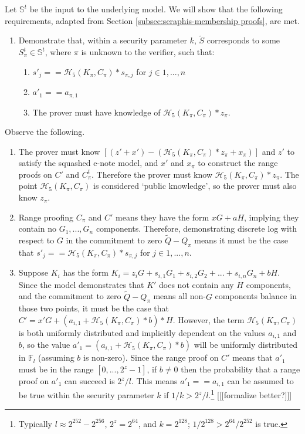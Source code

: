 \begin{appendices}
Let $\mathbb{S}^t$ be the input to the underlying model. We will show that the following requirements, adapted from Section \ref{subsec:seraphis-membership proofs}, are met.

\begin{enumerate}
    \item Demonstrate that, within a security parameter $k$, $\tilde{S}$ corresponds to some $S^t_{\pi} \in \mathbb{S}^t$, where $\pi$ is unknown to the verifier, such that:
    \begin{enumerate}
        \item $s'_j == \mathcal{H}_5(K_{\pi}, C_{\pi})*s_{\pi,j}$ for $j \in 1,...,n$
        \item $a'_1 == a_{\pi,1}$
        \item The prover must have knowledge of $\mathcal{H}_5(K_{\pi}, C_{\pi})*z_{\pi}$.
    \end{enumerate}
\end{enumerate}

Observe the following.

\begin{enumerate}
    \item The prover must know $[(z' + x') - (\mathcal{H}_5(K_{\pi}, C_{\pi})*z_{\pi} + x_{\pi})]$ and $z'$ to satisfy the squashed e-note model, and $x'$ and $x_{\pi}$ to construct the range proofs on $C'$ and $C^t_{\pi}$. Therefore the prover must know $\mathcal{H}_5(K_{\pi}, C_{\pi})*z_{\pi}$. The point $\mathcal{H}_5(K_{\pi}, C_{\pi})$ is considered `public knowledge', so the prover must also know $z_{\pi}$.

    \item Range proofing $C_{\pi}$ and $C'$ means they have the form $x G + a H$, implying they contain no $G_1,...,G_n$ components. Therefore, demonstrating discrete log with respect to $G$ in the commitment to zero $\tilde{Q} - Q_{\pi}$ means it must be the case that $s'_j == \mathcal{H}_5(K_{\pi}, C_{\pi})*s_{\pi,j}$ for $j \in 1,...,n$.

    \item Suppose $K_i$ has the form $K_i = z_i G + s_{i,1} G_1 + s_{i,2} G_2 + ... + s_{i,n} G_n + b H$. Since the model demonstrates that $K'$ does not contain any $H$ components, and the commitment to zero $\tilde{Q} - Q_{\pi}$ means all non-$G$ components balance in those two points, it must be the case that $C' = x' G + (a_{i,1} + \mathcal{H}_5(K_{\pi}, C_{\pi})*b)*H$. However, the term $\mathcal{H}_5(K_{\pi}, C_{\pi})$ is both uniformly distributed and implicitly dependent on the values $a_{i,1}$ and $b$, so the value $a'_1 = (a_{i,1} + \mathcal{H}_5(K_{\pi}, C_{\pi})*b)$ will be uniformly distributed in $\mathbb{F}_l$ (assuming $b$ is non-zero). Since the range proof on $C'$ means that $a'_1$ must be in the range $[0,...,2^z - 1]$, if $b \neq 0$ then the probability that a range proof on $a'_1$ can succeed is $2^z/l$. This means $a'_1 == a_{i,1}$ can be assumed to be true within the security parameter $k$ if $1/k > 2^z/l$.\footnote{Typically $l \approx 2^{252} - 2^{256}$, $2^z = 2^{64}$, and $k = 2^{128}$; $1/2^{128} > 2^{64}/2^{252}$ is true.} [[[formalize better?]]]
\end{enumerate}


\end{appendices}
